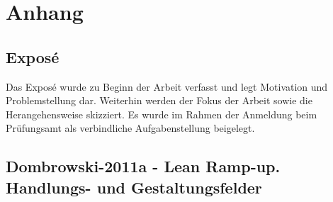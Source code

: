 \chapter{Anhang}
\section{Exposé}
Das Exposé wurde zu Beginn der Arbeit verfasst und legt Motivation und Problemstellung dar. Weiterhin werden der Fokus der Arbeit sowie die Herangehensweise skizziert. Es wurde im Rahmen der Anmeldung beim Prüfungsamt als verbindliche Aufgabenstellung beigelegt. 

\section{Dombrowski-2011a - Lean Ramp-up. Handlungs- und Gestaltungsfelder}
